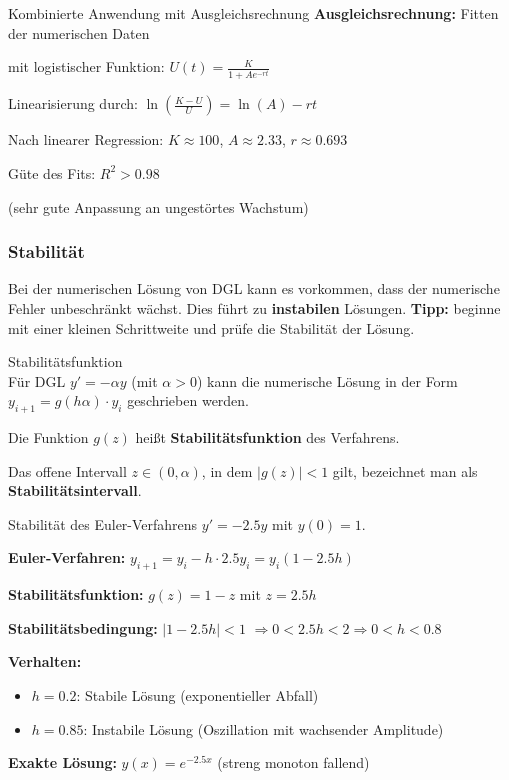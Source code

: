 \begin{example2}{Kombinierte Anwendung mit Ausgleichsrechnung}
\textbf{Ausgleichsrechnung:} Fitten der numerischen Daten 

mit logistischer Funktion: $U(t) = \frac{K}{1 + Ae^{-rt}}$

Linearisierung durch: $\ln(\frac{K-U}{U}) = \ln(A) - rt$

Nach linearer Regression: $K \approx 100$, $A \approx 2.33$, $r \approx 0.693$

Güte des Fits: $R^2 > 0.98$

(sehr gute Anpassung an ungestörtes Wachstum)
\end{example2} 

\raggedcolumns
\columnbreak

\subsubsection{Stabilität}

\begin{remark}
  Bei der numerischen Lösung von DGL kann es vorkommen, dass der numerische Fehler unbeschränkt wächst. Dies führt zu \textbf{instabilen} Lösungen.
  \textbf{Tipp:} beginne mit einer kleinen Schrittweite und prüfe die Stabilität der Lösung.
\end{remark}

\begin{definition}{Stabilitätsfunktion}\\
Für DGL $y' = -\alpha y$ (mit $\alpha > 0$) kann die numerische Lösung in der Form
$y_{i+1} = g(h\alpha) \cdot y_i$
geschrieben werden. 

Die Funktion $g(z)$ heißt \textbf{Stabilitätsfunktion} des Verfahrens.

Das offene Intervall $z \in (0, \alpha)$, in dem $|g(z)| < 1$ gilt, bezeichnet man als \textbf{Stabilitätsintervall}.
\end{definition}

\begin{example2}{Stabilität des Euler-Verfahrens} $y' = -2.5y$ mit $y(0) = 1$.

\textbf{Euler-Verfahren:} $y_{i+1} = y_i - h \cdot 2.5 y_i = y_i(1 - 2.5h)$

\textbf{Stabilitätsfunktion:} $g(z) = 1 - z$ mit $z = 2.5h$

\textbf{Stabilitätsbedingung:} $|1 - 2.5h| < 1$
$\Rightarrow 0 < 2.5h < 2 \Rightarrow 0 < h < 0.8$

\textbf{Verhalten:}
\begin{itemize}
    \item $h = 0.2$: Stabile Lösung (exponentieller Abfall)
    \item $h = 0.85$: Instabile Lösung (Oszillation mit wachsender Amplitude)
\end{itemize}

\textbf{Exakte Lösung:} $y(x) = e^{-2.5x}$ (streng monoton fallend)
\end{example2}

